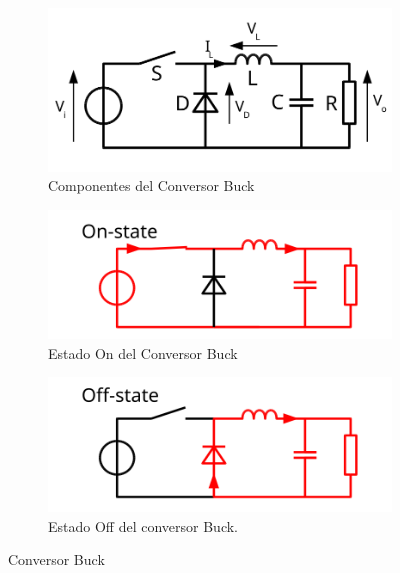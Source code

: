                 \begin{figure}[!ht]
                    \centering
                    \begin{subfigure}[b]{0.3\textwidth}
                        \centering
                        \includegraphics[width=\textwidth]{MPPT/Buck.png}
                        \caption{Componentes del Conversor Buck}
                        \label{fig:m1.1}
                    \end{subfigure}
                    \begin{subfigure}[b]{0.3\textwidth}
                        \centering
                        \includegraphics[width=\textwidth]{MPPT/Buck-On.png}
                        \caption{Estado On del Conversor Buck}
                        \label{fig:m1.2}
                    \end{subfigure}
                    \begin{subfigure}[b]{0.3\textwidth}
                        \centering
                        \includegraphics[width=\textwidth]{MPPT/Buck-Off.png}
                        \caption{Estado Off del conversor Buck.}
                        \label{fig:m1.3}
                    \end{subfigure}
                    \caption{Conversor Buck}
                    \label{fig:m1}
                \end{figure}

